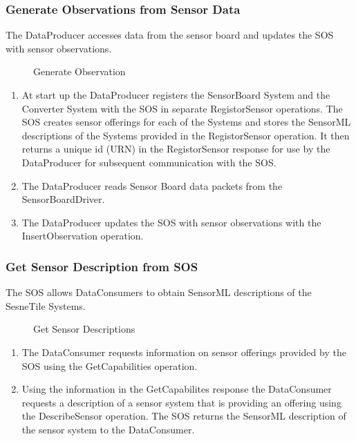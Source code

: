 \documentclass[]{final_report}
\begin{document}
\subsubsection{Generate Observations from Sensor Data}
The DataProducer accesses data from the sensor board and updates the SOS with sensor observations.
\begin{figure}[h]
\centering
{}
\caption{Generate Observation}\label{fig:InsertObs}
\end{figure}
 \begin{enumerate}
\item At start up the DataProducer registers the SensorBoard System and the Converter System with the SOS in separate RegistorSensor operations. The SOS creates sensor offerings for each of the Systems and stores the SensorML descriptions of the Systems provided in the RegistorSensor operation. It then returns a unique id (URN) in the RegistorSensor response for use by the DataProducer for subsequent communication with the SOS.
\item The DataProducer reads Sensor Board data packets from the SensorBoardDriver.
\item The DataProducer updates the SOS with sensor observations with the InsertObservation operation.
\end{enumerate}

\subsubsection{Get Sensor Description from SOS}
The SOS allows DataConsumers to obtain SensorML descriptions of the SesneTile Systems.
\begin{figure}[h]
\centering
{}
\caption{Get Sensor Descriptions}\label{fig:GetMeta}
\end{figure}
 \begin{enumerate}
\item The DataConsumer requests information on sensor offerings provided by the SOS using the GetCapabilities operation.
\item Using the information in the GetCapabilites response the DataConsumer requests a description of a sensor system that is providing an offering using the DescribeSensor operation. The SOS returns the SensorML description of the sensor system to the DataConsumer.
\end{enumerate}
\end{document}
